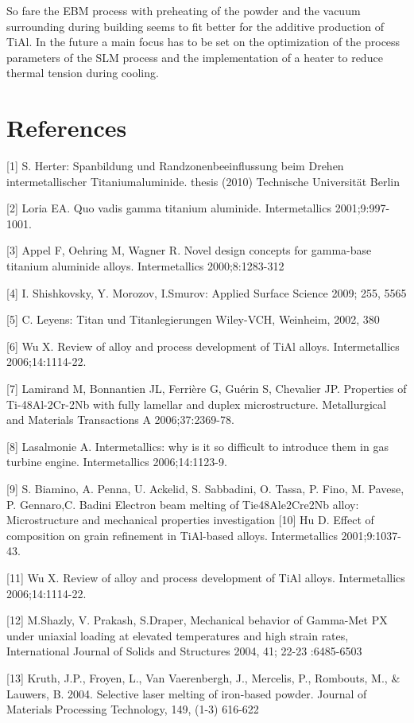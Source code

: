 \documentclass[10pt]{article}
\begin{document}
So fare the EBM process with preheating of the powder and the vacuum surrounding during building seems to fit better for the additive production of TiAl. In the future a main focus has to be set on the optimization of the process parameters of the SLM process and the implementation of a heater to reduce thermal tension during cooling.

\section*{References}
[1] S. Herter: Spanbildung und Randzonenbeeinflussung beim Drehen intermetallischer Titaniumaluminide. thesis (2010) Technische Universität Berlin

[2] Loria EA. Quo vadis gamma titanium aluminide. Intermetallics 2001;9:997-1001.

[3] Appel F, Oehring M, Wagner R. Novel design concepts for gamma-base titanium aluminide alloys. Intermetallics 2000;8:1283-312

[4] I. Shishkovsky, Y. Morozov, I.Smurov: Applied Surface Science 2009; 255, 5565

[5] C. Leyens: Titan und Titanlegierungen Wiley-VCH, Weinheim, 2002, 380

[6] Wu X. Review of alloy and process development of TiAl alloys. Intermetallics 2006;14:1114-22.

[7] Lamirand M, Bonnantien JL, Ferrière G, Guérin S, Chevalier JP. Properties of Ti-48Al-2Cr-2Nb with fully lamellar and duplex microstructure. Metallurgical and Materials Transactions A 2006;37:2369-78.

[8] Lasalmonie A. Intermetallics: why is it so difficult to introduce them in gas turbine engine. Intermetallics 2006;14:1123-9.

[9] S. Biamino, A. Penna, U. Ackelid, S. Sabbadini, O. Tassa, P. Fino, M. Pavese, P. Gennaro,C. Badini Electron beam melting of Tie48Ale2Cre2Nb alloy: Microstructure and mechanical properties investigation [10] Hu D. Effect of composition on grain refinement in TiAl-based alloys. Intermetallics 2001;9:1037-43.

[11] Wu X. Review of alloy and process development of TiAl alloys. Intermetallics 2006;14:1114-22.

[12] M.Shazly, V. Prakash, S.Draper, Mechanical behavior of Gamma-Met PX under uniaxial loading at elevated temperatures and high strain rates, International Journal of Solids and Structures 2004, 41; 22-23 :6485-6503

[13] Kruth, J.P., Froyen, L., Van Vaerenbergh, J., Mercelis, P., Rombouts, M., \& Lauwers, B. 2004. Selective laser melting of iron-based powder. Journal of Materials Processing Technology, 149, (1-3) 616-622
\end{document}
